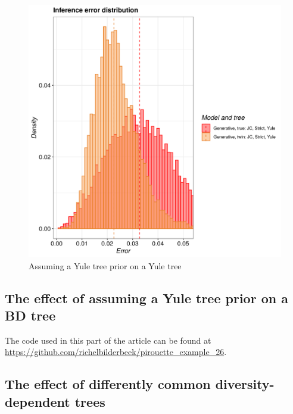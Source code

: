\begin{figure}[H]
  \includegraphics[width=\textwidth]{pirouette_example_22/example_22_314/errors.png}
  \caption{Assuming a Yule tree prior on a Yule tree}
\end{figure}

\subsection{The effect of assuming a Yule tree prior on a BD tree}

The code used in this part of the article can be found at 
\url{https://github.com/richelbilderbeek/pirouette_example_26}.



\subsection{The effect of differently common diversity-dependent trees}

